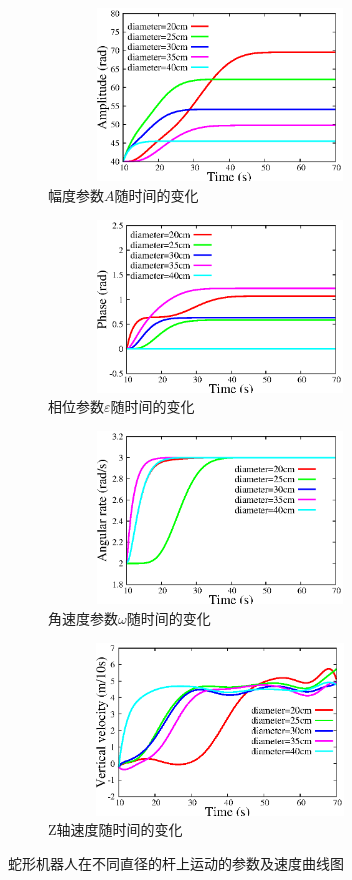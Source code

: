\begin{figure}[htbp]
	\centering
	\begin{subfigure}{0.45\textwidth}{
			\centering
			\includegraphics[width=1\textwidth,height=130pt]{figure/chap05/samplifier.eps}
			\caption{幅度参数$A$随时间的变化}
			\label{fig:samplifier}
		}
	\end{subfigure}
	\begin{subfigure}{0.45\textwidth}{
			\centering
			\includegraphics[width=1\textwidth,height=130pt]{figure/chap05/sphase.eps}
			\caption{相位参数$\varepsilon$随时间的变化}
			\label{fig:sphase}
		}
	\end{subfigure}
	\begin{subfigure}{0.45\textwidth}{
			\centering
			\includegraphics[width=1\textwidth,height=130pt]{figure/chap05/sarate.eps}	
			\caption{角速度参数$\omega$随时间的变化}
			\label{fig:sarate}
		}
	\end{subfigure}
	\begin{subfigure}{0.45\textwidth}{
			\centering
			\includegraphics[width=1\textwidth,height=130pt]{figure/chap05/svel.eps}
			\caption{Z轴速度随时间的变化}
			\label{fig:svelocity}
		}
	\end{subfigure}
	\caption{蛇形机器人在不同直径的杆上运动的参数及速度曲线图}
	\label{fig:scurve}
\end{figure}

